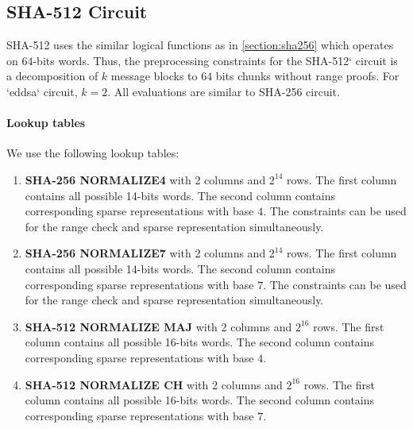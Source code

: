 \subsection{SHA-512 Circuit}
\label{section:sha512}
SHA-512 uses the similar logical functions as in \ref{section:sha256} which operates on $64$-bits words.
Thus, the preprocessing constraints for the SHA-512` circuit is a decomposition of $k$ message blocks to $64$ bits chunks without range proofs. For `eddsa` circuit, $k = 2$.
All evaluations are similar to SHA-256 circuit.

\paragraph{Lookup tables} 
We use the following lookup tables:
\begin{enumerate}
\item \textbf{SHA-256 NORMALIZE4} with 2 columns and $2^{14}$ rows. 
The first column contains all possible 14-bits words.
The second column contains corresponding sparse representations with base $4$.
The constraints can be used for the range check and sparse representation simultaneously.
\item \textbf{SHA-256 NORMALIZE7} with 2 columns and $2^{14}$ rows. 
The first column contains all possible 14-bits words.
The second column contains corresponding sparse representations with base $7$.
The constraints can be used for the range check and sparse representation simultaneously.
\item \textbf{SHA-512 NORMALIZE MAJ} with 2 columns and $2^{16}$ rows. 
The first column contains all possible 16-bits words.
The second column contains corresponding sparse representations with base $4$.
\item \textbf{SHA-512 NORMALIZE CH} with 2 columns and $2^{16}$ rows. 
The first column contains all possible 16-bits words.
The second column contains corresponding sparse representations with base $7$.
\end{enumerate}

